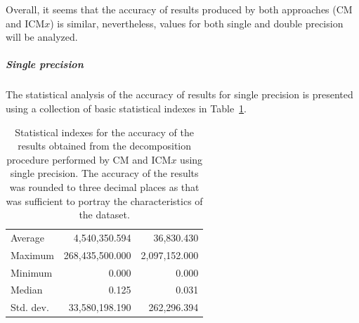 \begin{figure}[ht!]
	\label{Graph:benchmark-results-performance-of-implementations-across-all-matrices-accuracy-single-double-precision}
\end{figure}

Overall, it seems that the accuracy of results produced by both approaches (CM and ICM$ x $) is similar, nevertheless, values for both single and double precision will be analyzed.
\subparagraph{Single precision} The statistical analysis of the accuracy of results for single precision is presented using a collection of basic statistical indexes in Table~\ref{Table:benchmark-results-performance-of-implementations-across-all-matrices-accuracy-statistical-indexes-single-precision}.

\begin{table}[ht!]
	\centering
	\renewcommand{\arraystretch}{1.5}
	\begin{tabular}{|>{\footnotesize}l|>{\raggedleft\arraybackslash\footnotesize}r|>{\raggedleft\arraybackslash\footnotesize}r|}
		\hline
		\multicolumn{1}{|>{\centering\footnotesize}c|}{Accuracy index} & \multicolumn{1}{>{\centering\footnotesize}c|}{CM} & \multicolumn{1}{>{\centering\footnotesize}c|}{ICM$ x $} \\
		\hline
		Average   &   4,540,350.594 &    36,830.430 \\
		Maximum   & 268,435,500.000 & 2,097,152.000 \\
		Minimum   &           0.000 &         0.000 \\
		Median    &           0.125 &         0.031 \\
		Std. dev. &  33,580,198.190 &   262,296.394 \\
		\hline
	\end{tabular}
	\caption{Statistical indexes for the accuracy of the results obtained from the decomposition procedure performed by CM and ICM$ x $ using single precision. The accuracy of the results was rounded to three decimal places as that was sufficient to portray the characteristics of the dataset.}
	\label{Table:benchmark-results-performance-of-implementations-across-all-matrices-accuracy-statistical-indexes-single-precision}
\end{table}

